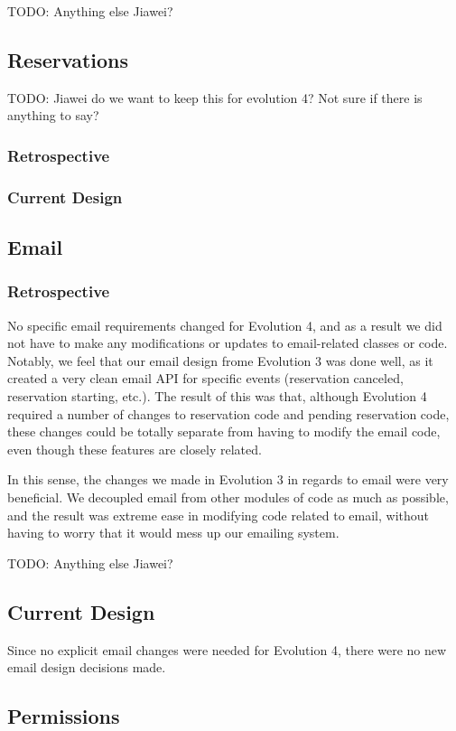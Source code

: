 \documentclass[12pt]{article}
\begin{document}
{\huge TODO: Anything else Jiawei?}


\subsection{Reservations}
{\huge TODO: Jiawei do we want to keep this for evolution 4?  Not sure if there is anything to say?}
\subsubsection{Retrospective}


\subsubsection{Current Design}


\subsection{Email}
\subsubsection{Retrospective}
No specific email requirements changed for Evolution 4, and as a result we did not have to make any modifications or updates to email-related classes or code. Notably, we feel that our email design frome Evolution 3 was done well, as it created a very clean email API for specific events (reservation canceled, reservation starting, etc.). The result of this was that, although Evolution 4 required a number of changes to reservation code and pending reservation code, these changes could be totally separate from having to modify the email code, even though these features are closely related. 

In this sense, the changes we made in Evolution 3 in regards to email were very beneficial. We decoupled email from other modules of code as much as possible, and the result was extreme ease in modifying code related to email, without having to worry that it would mess up our emailing system. 

{\huge TODO: Anything else Jiawei?}

\subsection{Current Design}
Since no explicit email changes were needed for Evolution 4, there were no new email design decisions made. 

\subsection{Permissions}
\end{document}
